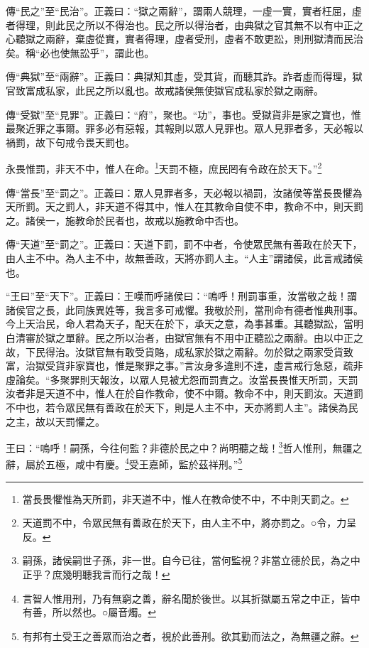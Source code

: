 {\noindent\zhuan{}\fzbyks 傳“民之”至“民治”。正義曰：“獄之兩辭”，謂兩人競理，一虛一實，實者枉屈，虛者得理，則此民之所以不得治也。民之所以得治者，由典獄之官其無不以有中正之心聽獄之兩辭，棄虛從實，實者得理，虛者受刑，虛者不敢更訟，則刑獄清而民治矣。稱“必也使無訟乎”，謂此也。 \par}

{\noindent\zhuan{}\fzbyks 傳“典獄”至“兩辭”。正義曰：典獄知其虛，受其貨，而聽其詐。詐者虛而得理，獄官致富成私家，此民之所以亂也。故戒諸侯無使獄官成私家於獄之兩辭。 \par}

{\noindent\zhuan{}\fzbyks 傳“受獄”至“見罪”。正義曰：“府”，聚也。“功”，事也。受獄貨非是家之寶也，惟最聚近罪之事爾。罪多必有惡報，其報則以眾人見罪也。眾人見罪者多，天必報以禍罰，故下句戒令畏天罰也。 \par}

永畏惟罰，非天不中，惟人在命。\footnote{當長畏懼惟為天所罰，非天道不中，惟人在教命使不中，不中則天罰之。}天罰不極，庶民罔有令政在於天下。”\footnote{天道罰不中，令眾民無有善政在於天下，由人主不中，將亦罰之。○令，力呈反。}

{\noindent\zhuan{}\fzbyks 傳“當長”至“罰之”。正義曰：眾人見罪者多，天必報以禍罰，汝諸侯等當長畏懼為天所罰。天之罰人，非天道不得其中，惟人在其教命自使不申，教命不中，則天罰之。諸侯一，施教命於民者也，故戒以施教命中否也。 \par}

{\noindent\zhuan{}\fzbyks 傳“天道”至“罰之”。正義曰：天道下罰，罰不中者，令使眾民無有善政在於天下，由人主不中。為人主不中，故無善政，天將亦罰人主。“人主”謂諸侯，此言戒諸侯也。 \par}

{\noindent\shu{}\fzkt “王曰”至“天下”。正義曰：王嘆而呼諸侯曰：“嗚呼！刑罰事重，汝當敬之哉！謂諸侯官之長，此同族異姓等，我言多可戒懼。我敬於刑，當刑命有德者惟典刑事。今上天治民，命人君為天子，配天在於下，承天之意，為事甚重。其聽獄訟，當明白清審於獄之單辭。民之所以治者，由獄官無有不用中正聽訟之兩辭。由以中正之故，下民得治。汝獄官無有敢受貨賂，成私家於獄之兩辭。勿於獄之兩家受貨致富，治獄受貨非家寶也，惟是聚罪之事。”言汝身多違則不達，虛言戒行急惡，疏非虛論矣。“多聚罪則天報汝，以眾人見被尤怨而罰責之。汝當長畏惟天所罰，天罰汝者非是天道不中，惟人在於自作教命，使不中爾。教命不中，則天罰汝。天道罰不中也，若令眾民無有善政在於天下，則是人主不中，天亦將罰人主”。諸侯為民之主，故以天罰懼之。 \par}

王曰：“嗚呼！嗣孫，今往何監？非德於民之中？尚明聽之哉！\footnote{嗣孫，諸侯嗣世子孫，非一世。自今已往，當何監視？非當立德於民，為之中正乎？庶幾明聽我言而行之哉！}哲人惟刑，無疆之辭，屬於五極，咸中有慶。\footnote{言智人惟用刑，乃有無窮之善，辭名聞於後世。以其折獄屬五常之中正，皆中有善，所以然也。○屬音燭。}受王嘉師，監於茲祥刑。”\footnote{有邦有土受王之善眾而治之者，視於此善刑。欲其勤而法之，為無疆之辭。}


